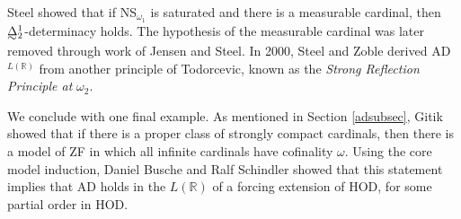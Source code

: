 \documentclass{book}%
\def\underTilde#1{{\baselineskip=0pt\vtop{\hbox{$#1$}\hbox{$\sim$}}}{}}
\newcommand{\uTDelta}{\underTilde{\Delta}}
\begin{document}








Steel  showed that if NS$_{\omega_{1}}$ is
saturated and there is a measurable cardinal, then
$\uTDelta^{1}_{2}$-determinacy holds. The hypothesis of the measurable cardinal was
later removed through work of Jensen and Steel.
In 2000, Steel and Zoble \cite{SteelZoble} derived AD$^{L(\mathbb{R})}$ from
another principle of Todorcevic, known as the \emph{Strong Reflection Principle at} $\omega_{2}$.

We conclude with one final example. As mentioned in Section \ref{adsubsec}, Gitik showed that if there is a proper class of strongly compact
cardinals, then there is a model of ZF in which all infinite
cardinals have cofinality $\omega$. Using the core model induction, Daniel Busche and Ralf Schindler  showed that this
statement implies that AD holds in the $L(\mathbb{R})$ of a forcing
extension of HOD, for some partial order in HOD.














\end{document}
